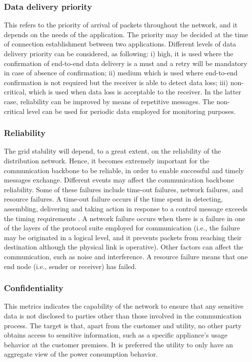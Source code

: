 \documentclass[11pt,draftclsnofoot,onecolumn]{IEEEtran}
\begin{document}
\subsubsection{Data delivery priority}
This refers to the priority of arrival of packets throughout the network, and it depends on the needs of the application. The priority may be decided at the time of connection establishment between two applications. Different levels of data delivery priority can be considered, as following: i) high, it is used where the confirmation of end-to-end data delivery is a must and a retry will be mandatory in case of absence of confirmation; ii) medium which is used where end-to-end confirmation is not required but the receiver is able to detect data loss; iii) non-critical, which is used when data loss is acceptable to the receiver. In the latter case, reliability can be improved by means of repetitive messages. The non-critical level can be used for periodic data employed for monitoring purposes. 

\subsubsection{Reliability}
The grid stability will depend, to a great extent, on the reliability of the distribution network. Hence, it becomes extremely important for the communication backbone to be reliable, in order to enable successful and timely messages exchange. Different events may affect the communication backbone reliability. Some of these failures include time-out failures, network failures, and resource failures. A time-out failure occurs if the time spent in detecting, assembling, delivering and taking action in response to a control message exceeds the timing requirements \cite{Wang2011a}.  A network failure occurs when there is a failure in one of the layers of the protocol suite employed for communication (i.e., the failure may be originated in a logical level, and it prevents packets from reaching their destination although the physical link is operative). Other factors can affect the communication, such as noise and interference. A resource failure means that one end node (i.e., sender or receiver) has failed.

\subsubsection{Confidentiality}
This metrics indicates the capability of the network to ensure that any sensitive data is not disclosed to parties other than those involved in the communication process. The target is that, apart from the customer and utility, no other party obtains access to sensitive information, such as a specific appliance's usage behavior at the customer premises. It is preferred the utility to only have an aggregate view of the power consumption behavior.
\end{document}
